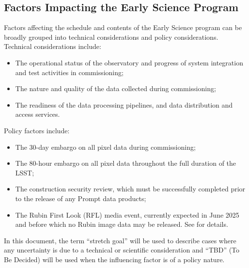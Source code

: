 \subsection{Factors Impacting the Early Science Program}
\label{ssec:impact}

Factors affecting the schedule and contents of the Early Science program can be broadly grouped into technical considerations and policy considerations.
Technical considerations include:
\begin{itemize}
\item The operational status of the observatory and progress of system integration and test activities in commissioning;
\item The nature and quality of the data collected during commissioning;
\item The readiness of the data processing pipelines, and data distribution and access services.
\end{itemize}
Policy factors include:
\begin{itemize}
\item The 30-day embargo on all pixel data during commissioning;
\item The 80-hour embargo on all pixel data throughout the full duration of the LSST;
\item The  construction security review, which must be successfully completed prior to the release of any Prompt data products;
\item The Rubin First Look (RFL) media event, currently expected in June 2025 and before which  no Rubin image data may be released. See  for details.
\end{itemize}
In this document, the term ``stretch goal'' will be used to describe cases where any uncertainty is due to a technical or scientific consideration and ``TBD'' (To Be Decided) will be used when the influencing factor is of a policy nature.
